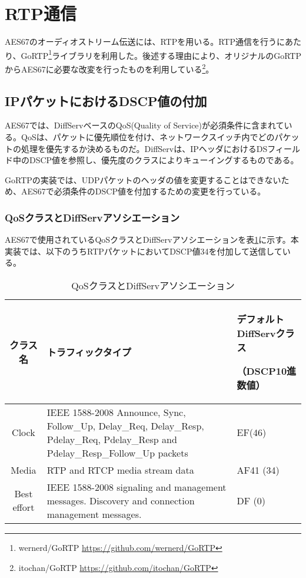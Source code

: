 \section{RTP通信}

AES67のオーディオストリーム伝送には、RTPを用いる。RTP通信を行うにあたり、GoRTP\footnote{wernerd/GoRTP \url{https://github.com/wernerd/GoRTP}}ライブラリを利用した。後述する理由により、オリジナルのGoRTPからAES67に必要な改変を行ったものを利用している\footnote{itochan/GoRTP \url{https://github.com/itochan/GoRTP}}。

\subsection{IPパケットにおけるDSCP値の付加}

AES67では、DiffServベースのQoS(Quality of Service)が必須条件に含まれている。QoSは、パケットに優先順位を付け、ネットワークスイッチ内でどのパケットの処理を優先するか決めるものだ。DiffServは、IPヘッダにおけるDSフィールド中のDSCP値を参照し、優先度のクラスによりキューイングするものである\cite{yamaha_diffserv}。

GoRTPの実装では、UDPパケットのヘッダの値を変更することはできないため、AES67で必須条件のDSCP値を付加するための変更を行っている。

\subsubsection{QoSクラスとDiffServアソシエーション}

AES67で使用されているQoSクラスとDiffServアソシエーションを表\ref{tab:diffserv_class}に示す\cite{aes67-2018}。本実装では、以下のうちRTPパケットにおいてDSCP値34を付加して送信している。

\begin{table}[htbp]
  \centering
  \caption{QoSクラスとDiffServアソシエーション}
  \label{tab:diffserv_class}
  \begin{tabular}{c|p{10cm}|p{3cm}}
    クラス名 & トラフィックタイプ & デフォルトDiffServクラス\par （DSCP10進数値） \\ \hline
    Clock & IEEE 1588-2008 Announce, Sync, Follow\_Up, Delay\_Req, Delay\_Resp, Pdelay\_Req, Pdelay\_Resp and Pdelay\_Resp\_Follow\_Up packets & EF(46) \\
    Media & RTP and RTCP media stream data & AF41 (34) \\
    Best effort & IEEE 1588-2008 signaling and management messages. Discovery and connection management messages. & DF (0)
  \end{tabular}
\end{table}

